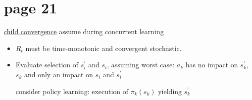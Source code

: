 \section*{page 21}

\underline{child convergence} assume during concurrent learning\\

\begin{itemize}
\item $R_t$ must be time-monotonic and convergent stochastic.\\
\item Evaluate selection of $s^\prime_i$ and $s_i$, assuming worst case: $a_k$ has no impact on $s^\prime_k$, $s_k$ and only an impact on $s_i$ and $s^\prime_i$\\
\begin{center}
\end{center}
consider policy learning: execution of $\pi_k(s_k)$ yielding $s^\prime_k$
\end{itemize}

